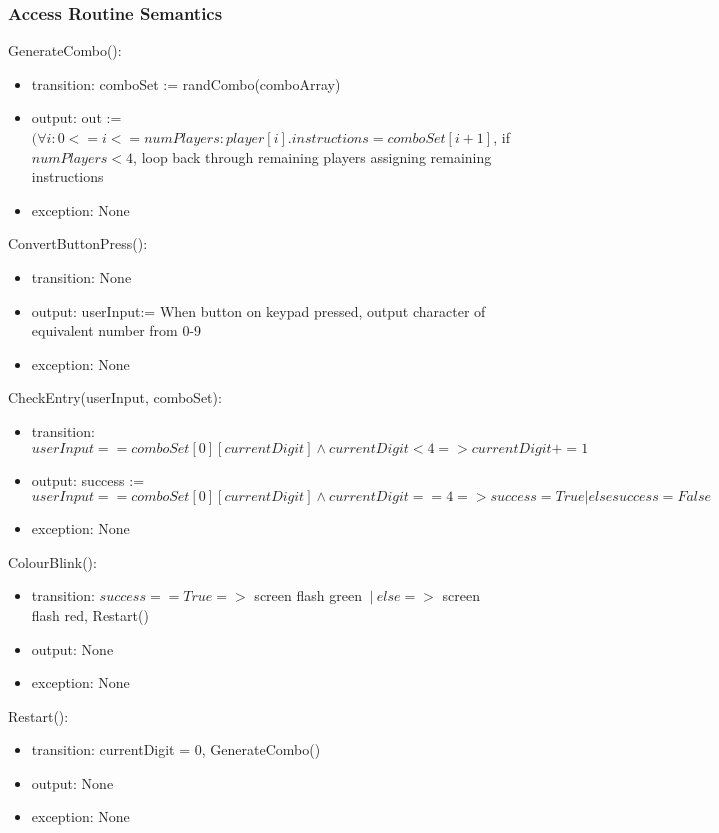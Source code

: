 \documentclass[12pt, titlepage]{article}
\begin{document}
\subsubsection{Access Routine Semantics}

\noindent GenerateCombo():
\begin{itemize}
\item transition: comboSet := randCombo(comboArray)
\item output: out := $ (\forall i : 0<=i<=numPlayers : player[i].instructions = comboSet[i+1]$, if $numPlayers<4$, loop back through remaining players assigning remaining instructions
\item exception: None
\end{itemize}

\noindent ConvertButtonPress():
\begin{itemize}
\item transition: None
\item output: userInput:= When button on keypad pressed, output character of equivalent number from 0-9
\item exception: None
\end{itemize}

\noindent CheckEntry(userInput, comboSet):
\begin{itemize}
\item transition: $userInput == comboSet[0][currentDigit] \land currentDigit<4 => currentDigit+=1$
\item output: success := $userInput == comboSet[0][currentDigit] \land currentDigit==4 => success=True | else success = False$
\item exception: None
\end{itemize}

\noindent ColourBlink():
\begin{itemize}
\item transition: $success == True =>$ screen flash green $\: | \: else =>$ screen flash red, Restart()
\item output: None
\item exception: None
\end{itemize}

\noindent Restart():
\begin{itemize}
\item transition: currentDigit = 0, GenerateCombo()
\item output: None
\item exception: None
\end{itemize}
\end{document}
